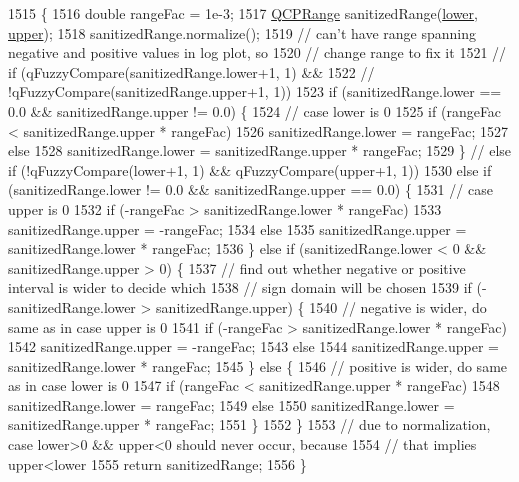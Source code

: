 \begin{DoxyCode}
1515                                               \{
1516   \textcolor{keywordtype}{double} rangeFac = 1e-3;
1517   \hyperlink{class_q_c_p_range}{QCPRange} sanitizedRange(\hyperlink{class_q_c_p_range_aa3aca3edb14f7ca0c85d912647b91745}{lower}, \hyperlink{class_q_c_p_range_ae44eb3aafe1d0e2ed34b499b6d2e074f}{upper});
1518   sanitizedRange.normalize();
1519   \textcolor{comment}{// can't have range spanning negative and positive values in log plot, so}
1520   \textcolor{comment}{// change range to fix it}
1521   \textcolor{comment}{// if (qFuzzyCompare(sanitizedRange.lower+1, 1) &&}
1522   \textcolor{comment}{// !qFuzzyCompare(sanitizedRange.upper+1, 1))}
1523   \textcolor{keywordflow}{if} (sanitizedRange.lower == 0.0 && sanitizedRange.upper != 0.0) \{
1524     \textcolor{comment}{// case lower is 0}
1525     \textcolor{keywordflow}{if} (rangeFac < sanitizedRange.upper * rangeFac)
1526       sanitizedRange.lower = rangeFac;
1527     \textcolor{keywordflow}{else}
1528       sanitizedRange.lower = sanitizedRange.upper * rangeFac;
1529   \} \textcolor{comment}{// else if (!qFuzzyCompare(lower+1, 1) && qFuzzyCompare(upper+1, 1))}
1530   \textcolor{keywordflow}{else} \textcolor{keywordflow}{if} (sanitizedRange.lower != 0.0 && sanitizedRange.upper == 0.0) \{
1531     \textcolor{comment}{// case upper is 0}
1532     \textcolor{keywordflow}{if} (-rangeFac > sanitizedRange.lower * rangeFac)
1533       sanitizedRange.upper = -rangeFac;
1534     \textcolor{keywordflow}{else}
1535       sanitizedRange.upper = sanitizedRange.lower * rangeFac;
1536   \} \textcolor{keywordflow}{else} \textcolor{keywordflow}{if} (sanitizedRange.lower < 0 && sanitizedRange.upper > 0) \{
1537     \textcolor{comment}{// find out whether negative or positive interval is wider to decide which}
1538     \textcolor{comment}{// sign domain will be chosen}
1539     \textcolor{keywordflow}{if} (-sanitizedRange.lower > sanitizedRange.upper) \{
1540       \textcolor{comment}{// negative is wider, do same as in case upper is 0}
1541       \textcolor{keywordflow}{if} (-rangeFac > sanitizedRange.lower * rangeFac)
1542         sanitizedRange.upper = -rangeFac;
1543       \textcolor{keywordflow}{else}
1544         sanitizedRange.upper = sanitizedRange.lower * rangeFac;
1545     \} \textcolor{keywordflow}{else} \{
1546       \textcolor{comment}{// positive is wider, do same as in case lower is 0}
1547       \textcolor{keywordflow}{if} (rangeFac < sanitizedRange.upper * rangeFac)
1548         sanitizedRange.lower = rangeFac;
1549       \textcolor{keywordflow}{else}
1550         sanitizedRange.lower = sanitizedRange.upper * rangeFac;
1551     \}
1552   \}
1553   \textcolor{comment}{// due to normalization, case lower>0 && upper<0 should never occur, because}
1554   \textcolor{comment}{// that implies upper<lower}
1555   \textcolor{keywordflow}{return} sanitizedRange;
1556 \}
\end{DoxyCode}


